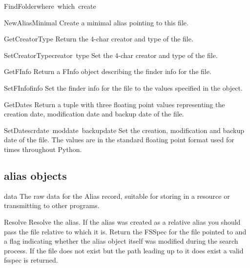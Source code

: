 \begin{funcdesc}{FindFolder}{where\, which\, create}
\begin{funcdesc}{NewAliasMinimal}{}
Create a minimal alias pointing to this file.
\end{funcdesc}

\begin{funcdesc}{GetCreatorType}{}
Return the 4-char creator and type of the file.
\end{funcdesc}

\begin{funcdesc}{SetCreatorType}{creator\, type}
Set the 4-char creator and type of the file.
\end{funcdesc}

\begin{funcdesc}{GetFInfo}{}
Return a FInfo object describing the finder info for the file.
\end{funcdesc}

\begin{funcdesc}{SetFInfo}{finfo}
Set the finder info for the file to the values specified in the
 object.
\end{funcdesc}

\begin{funcdesc}{GetDates}{}
Return a tuple with three floating point values representing the
creation date, modification date and backup date of the file.
\end{funcdesc}

\begin{funcdesc}{SetDates}{crdate\, moddate\, backupdate}
Set the creation, modification and backup date of the file. The values
are in the standard floating point format used for times throughout
Python.
\end{funcdesc}

\subsection{alias objects}

\renewcommand{\indexsubitem}{(alias object attribute)}
\begin{datadesc}{data}
The raw data for the Alias record, suitable for storing in a resource
or transmitting to other programs.
\end{datadesc}

\renewcommand{\indexsubitem}{(alias object method)}
\begin{funcdesc}{Resolve}{}
Resolve the alias. If the alias was created as a relative alias you
should pass the file relative to which it is. Return the FSSpec for
the file pointed to and a flag indicating whether the alias object
itself was modified during the search process. If the file does
not exist but the path leading up to it does exist a valid fsspec
is returned.
\end{funcdesc}


\end{funcdesc}
